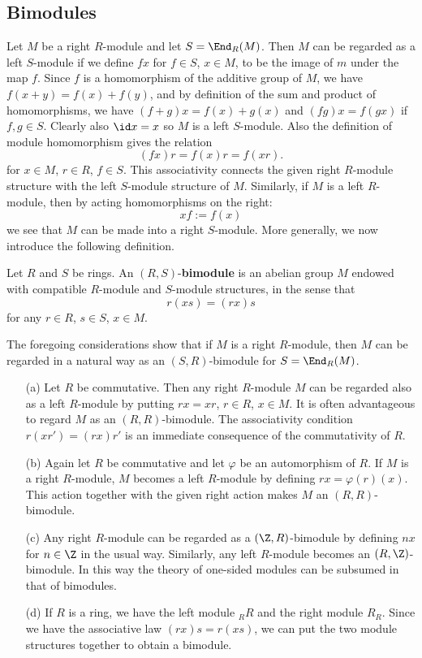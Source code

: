 \subsection{Bimodules}
Let $M$ be a right $R$-module and let $S=\End_R(M)$. Then $M$ can be regarded as a left $S$-module if we define $fx$ for $f\in S$, $x\in M$, to be the image of $m$ under the map $f$. Since $f$ is a homomorphism of the additive group of $M$, we have $f(x+y)=f(x)+f(y)$, and by definition of the sum and product of homomorphisms, we have $(f+g)x=f(x)+g(x)$ and $(fg)x=f(gx)$ if $f,g\in S$. Clearly also $\id x=x$ so $M$ is a left $S$-module. Also the definition of module homomorphism gives the relation
\[(fx)r=f(x)r=f(xr).\]
for $x\in M$, $r\in R$, $f\in S$. This associativity connects the given right $R$-module structure with the left $S$-module structure of $M$. Similarly, if $M$ is a left $R$-module, then by acting homomorphisms on the right:
\[xf:=f(x)\]
we see that $M$ can be made into a right $S$-module. More generally, we now introduce the following definition.
\begin{definition}
Let $R$ and $S$ be rings. An $(R,S)$-\textbf{bimodule} is an abelian group $M$ endowed with compatible $R$-module and $S$-module structures, in the sense that
\[r(xs)=(rx)s\]
for any $r\in R$, $s\in S$, $x\in M$.
\end{definition}
The foregoing considerations show that if $M$ is a right $R$-module, then $M$ can be regarded in a natural way as an $(S,R)$-bimodule for $S=\End_R(M)$.
\begin{example}
\mbox{}
\begin{itemize}
\item[(a)] Let $R$ be commutative. Then any right $R$-module $M$ can be regarded also as a left $R$-module by putting $rx=xr$, $r\in R$, $x\in M$. It is often advantageous to regard $M$ as an $(R,R)$-bimodule. The associativity condition $r(xr')=(rx)r'$ is an immediate consequence of the commutativity of $R$.
\item[(b)] Again let $R$ be commutative and let $\varphi$ be an automorphism of $R$. If $M$ is a right $R$-module, $M$ becomes a left $R$-module by defining $rx=\varphi(r)(x)$. This action together with the given right action makes $M$ an $(R,R)$-bimodule.
\item[(c)] Any right $R$-module can be regarded as a $(\Z,R)$-bimodule by defining $nx$ for $n\in\Z$ in the usual way. Similarly, any left $R$-module becomes an $(R,\Z)$-bimodule. In this way the theory of one-sided modules can be subsumed in that of bimodules.
\item[(d)] If $R$ is a ring, we have the left module $_{R}R$ and the right module $R_{R}$. Since we have the associative law $(rx)s=r(xs)$, we can put the two module structures together to obtain a bimodule.
\end{itemize}
\end{example}
